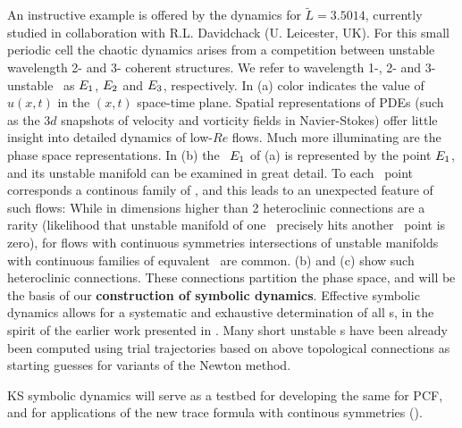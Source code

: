 An instructive 
example is offered by the dynamics for $\tilde{L}=3.5014$, %
currently studied in collaboration with
R.L. Davidchack (U. Leicester, UK).
For this small periodic cell
the chaotic dynamics arises from
a competition between unstable
wavelength 2- and 3- coherent structures.
We refer to wavelength 1-, 2- and 3- unstable \eqva\ as
$E_{1}$, $E_{2}$ and $E_{3}$,
respectively.
In  (a)
color indicates the value of $u(x,t)$ in 
the $(x,t)$ space-time plane.
Spatial representations of
PDEs (such as the 3$d$
snapshots of velocity and vorticity fields in Navier-Stokes)
offer little insight into detailed dynamics of low-$Re$ flows.
Much more illuminating are the phase space representations.
In  (b) the \eqv\ $E_{1}$ of
 (a) is represented by the point $E_{1}$,
and its unstable manifold can be examined in great detail.
To each \eqv\ point corresponds a continous family
of \eqva, and this leads to an unexpected feature of such
flows: While in dimensions higher than 2 heteroclinic connections 
are a rarity (likelihood that unstable manifold of one
 \eqv\ precisely hits another \eqv\ point is zero), 
for flows with continuous symmetries intersections of unstable
manifolds with continuous families of equvalent \eqva\ are common.
 (b) and (c) show 
such heteroclinic connections.
These connections partition the phase space,
and will be the basis of our
{\bf construction of symbolic dynamics}.
Effective symbolic dynamics allows
for a systematic and exhaustive determination 
of all \rpo s, in the spirit of 
the earlier work presented in .
Many short unstable \rpo s have been already 
been computed using trial trajectories based on above
topological connections as starting  guesses 
for variants of the Newton method.

KS symbolic dynamics will
serve as a testbed for developing the
same for PCF, and for applications of the new
trace formula with continous symmetries ().

